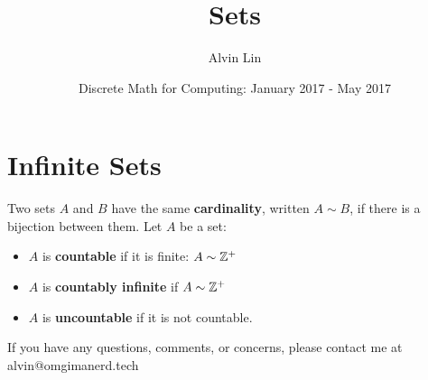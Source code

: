 \documentclass[letterpaper, 12pt]{math}
\title{Sets}
\author{Alvin Lin}
\date{Discrete Math for Computing: January 2017 - May 2017}
\begin{document}
\maketitle

\section*{Infinite Sets}
Two sets \( A \) and \( B \) have the same \textbf{cardinality}, written
\( A\sim B \), if there is a bijection between them.
Let \( A \) be a set:
\begin{itemize}
  \item \( A \) is \textbf{countable} if it is finite: \( A \sim \mathbb{Z}^{+} \)
  \item \( A \) is \textbf{countably infinite} if \( A \sim \mathbb{Z}^{+} \)
  \item \( A \) is \textbf{uncountable} if it is not countable.
\end{itemize}
\begin{center}
  If you have any questions, comments, or concerns, please contact me at
  alvin@omgimanerd.tech
\end{center}
\end{document}
